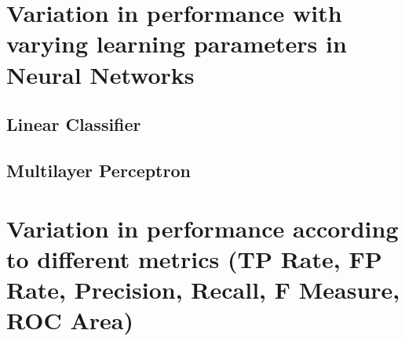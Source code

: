 \documentclass[11pt]{article}
\begin{document}
\newpage
\section{Variation in performance with varying learning parameters in Neural Networks}
\subsection{Linear Classifier}



\newpage
\subsection{Multilayer Perceptron}



\newpage
\section{Variation in performance according to different metrics (TP Rate, FP Rate, Precision,
Recall, F Measure, ROC Area)}
\end{document}
